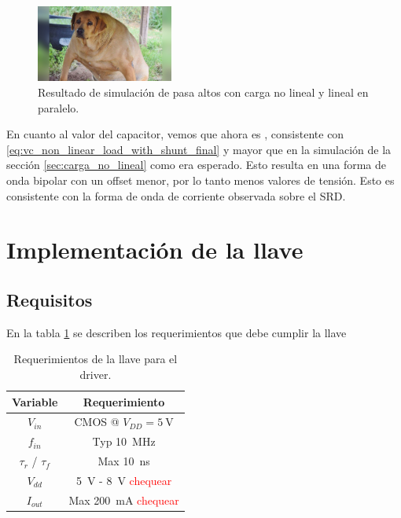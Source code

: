 \begin{figure}[tbp]
    \centering
    \includegraphics[width=0.4\textwidth]{images/placeholder.jpg}
    \caption{Resultado de simulación de pasa altos con carga no lineal y lineal
    en paralelo.}
    \label{fig:highpass_non_linear_w_shunt_simulation_result}
\end{figure}

En cuanto al valor del capacitor, vemos que ahora es , consistente con
\ref{eq:vc_non_linear_load_with_shunt_final} y mayor que en la simulación de la
sección \ref{sec:carga_no_lineal} como era esperado. Esto resulta en una forma
de onda bipolar con un offset menor, por lo tanto menos valores de tensión. Esto
es consistente con la forma de onda de corriente observada sobre el SRD.

\section{Implementación de la llave}

\subsection{Requisitos}

En la tabla \ref{tab:llave_requirements} se describen los requerimientos que
debe cumplir la llave

\begin{table}
\centering
\begin{tabular}{c|c}
\hline
    Variable & Requerimiento \\
\hline
    $V_{in}$                &   CMOS @ $V_{DD}=\qty{5}{\volt}$    \\
    $f_{in}$                &   Typ \qty{10}{\mega\hertz} \\
    $\tau_{r}$ / $\tau_{f}$ &   Max \qty{10}{\nano\second} \\
    $V_{dd}$                &   \qty{5}{\volt} - \qty{8}{\volt} \textcolor{red}{chequear} \\
    $I_{out}$               &   Max \qty{200}{\milli\ampere} \textcolor{red}{chequear}  \\
\hline
\end{tabular}
\caption{Requerimientos de la llave para el driver.}
\label{tab:llave_requirements}
\end{table}

